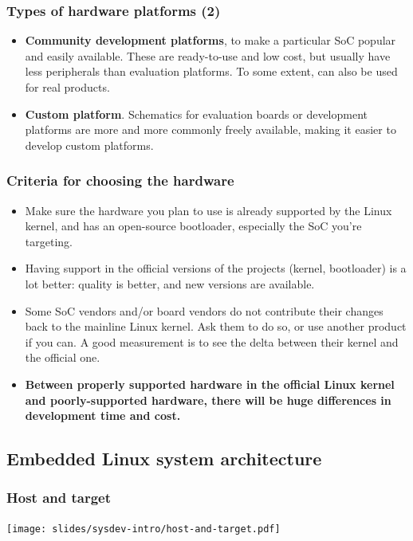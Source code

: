 \begin{frame}
  \frametitle{Types of hardware platforms (2)}
  \begin{itemize}
  \item {\bf Community development platforms}, to make a
    particular SoC popular and easily available. These are
    ready-to-use and low cost, but usually have less peripherals than
    evaluation platforms. To some extent, can also be used for real
    products.
  \item {\bf Custom platform}. Schematics for evaluation boards or
    development platforms are more and more commonly freely available,
    making it easier to develop custom platforms.
  \end{itemize}
\end{frame}

\begin{frame}
  \frametitle{Criteria for choosing the hardware}
  \begin{itemize}
  \item Make sure the hardware you plan to use is already supported by
    the Linux kernel, and has an open-source bootloader, especially
    the SoC you’re targeting.
  \item Having support in the official versions of the projects
    (kernel, bootloader) is a lot better: quality is better, and new
    versions are available.
  \item Some SoC vendors and/or board vendors do not contribute their
    changes back to the mainline Linux kernel. Ask them to do so, or
    use another product if you can. A good measurement is to see the
    delta between their kernel and the official one.
  \item {\bf Between properly supported hardware in the official Linux
      kernel and poorly-supported hardware, there will be huge
      differences in development time and cost.}
  \end{itemize}
\end{frame}

\subsection{Embedded Linux system architecture}

\begin{frame}
  \frametitle{Host and target}
  \begin{center}
    \texttt{[image: slides/sysdev-intro/host-and-target.pdf]}
  \end{center}
\end{frame}

